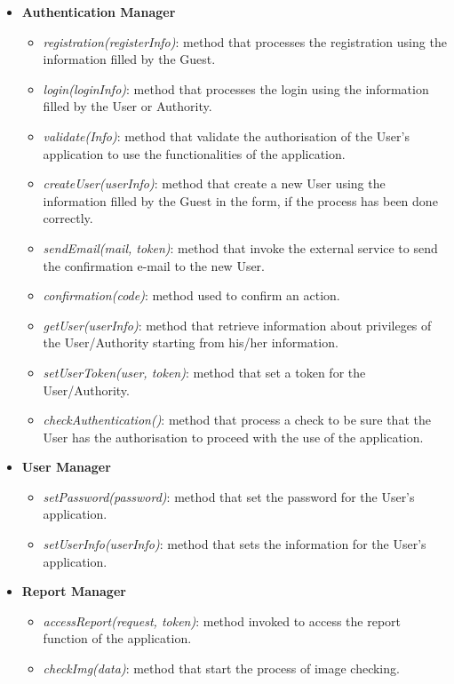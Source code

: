 \documentclass{article}
\begin{document}
	\begin{itemize}
    	\item {\bf Authentication Manager}
       		\begin{itemize}
        		\item {\it registration(registerInfo)}: method that processes the registration using the information filled by the Guest.
        		\item {\it login(loginInfo)}: method that processes the login using the information filled by the User or Authority.
        		\item {\it validate(Info)}: method that validate the authorisation of the User's application to use the functionalities of the application.
        		\item {\it createUser(userInfo)}: method that create a new User using the information filled by the Guest in the form, if the process has been done correctly.
        		\item {\it sendEmail(mail, token)}: method that invoke the external service to send the confirmation e-mail to the new User.
        		\item {\it confirmation(code)}: method used to confirm an action.
        		\item {\it getUser(userInfo)}: method that retrieve information about privileges of the User/Authority starting from his/her information.
        		\item {\it setUserToken(user, token)}: method that set a token for the User/Authority.
        		\item {\it checkAuthentication()}: method that process a check to be sure that the User has the authorisation to proceed with the use of the application. 
    		\end{itemize}
    	\item {\bf User Manager}
    		\begin{itemize}
        		\item {\it setPassword(password)}: method that set the password for the User's application.
        		\item {\it setUserInfo(userInfo)}: method that sets the information for the User's application.
    		\end{itemize}
    	\item {\bf Report Manager}
    		\begin{itemize}
        		\item {\it accessReport(request, token)}: method invoked to access the report function of the application.
        		\item {\it checkImg(data)}: method that start the process of image checking.

\end{itemize}
\end{itemize}
\end{document}
